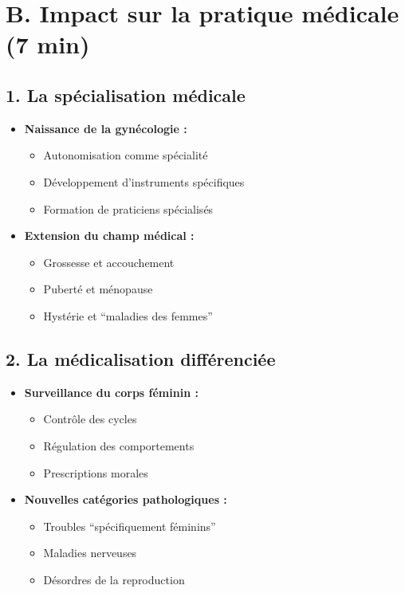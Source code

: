 \documentclass[
  letterpaper,
  DIV=11,
  numbers=noendperiod]{scrreprt}
\providecommand{\tightlist}{%
  \setlength{\itemsep}{0pt}\setlength{\parskip}{0pt}}\usepackage{longtable,booktabs,array}
\begin{document}
\section{B. Impact sur la pratique médicale (7
min)}\label{b.-impact-sur-la-pratique-muxe9dicale-7-min}

\subsection{1. La spécialisation
médicale}\label{la-spuxe9cialisation-muxe9dicale}

\begin{itemize}
\tightlist
\item
  \textbf{Naissance de la gynécologie :}

  \begin{itemize}
  \tightlist
  \item
    Autonomisation comme spécialité
  \item
    Développement d'instruments spécifiques
  \item
    Formation de praticiens spécialisés
  \end{itemize}
\item
  \textbf{Extension du champ médical :}

  \begin{itemize}
  \tightlist
  \item
    Grossesse et accouchement
  \item
    Puberté et ménopause
  \item
    Hystérie et ``maladies des femmes''
  \end{itemize}
\end{itemize}

\subsection{2. La médicalisation
différenciée}\label{la-muxe9dicalisation-diffuxe9renciuxe9e}

\begin{itemize}
\tightlist
\item
  \textbf{Surveillance du corps féminin :}

  \begin{itemize}
  \tightlist
  \item
    Contrôle des cycles
  \item
    Régulation des comportements
  \item
    Prescriptions morales
  \end{itemize}
\item
  \textbf{Nouvelles catégories pathologiques :}

  \begin{itemize}
  \tightlist
  \item
    Troubles ``spécifiquement féminins''
  \item
    Maladies nerveuses
  \item
    Désordres de la reproduction
  \end{itemize}
\end{itemize}
\end{document}
